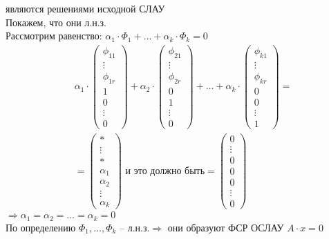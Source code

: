 \documentclass[a4paper,12pt]{article}
\begin{document}
являются решениями исходной СЛАУ\\
Покажем, что они л.н.з.\\
Рассмотрим равенство:
$\alpha_1\cdot \Phi_1+\ldots+\alpha_k\cdot \Phi_k=0$
\begin{align*}
&\alpha_1\cdot\begin{pmatrix}
\phi_{11}\\
\vdots\\
\phi_{1r}\\
1\\
0\\
\vdots\\
0
\end{pmatrix}+\alpha_2\cdot\begin{pmatrix}
\phi_{21}\\
\vdots\\
\phi_{2r}\\
0\\
1\\
\vdots\\
0
\end{pmatrix}+\ldots+\alpha_k\cdot\begin{pmatrix}
\phi_{k1}\\
\vdots\\
\phi_{kr}\\
0\\
0\\
\vdots\\
1
\end{pmatrix}=\\
&=\begin{pmatrix}
*\\
\vdots\\
*\\
\alpha_1\\
\alpha_2\\
\vdots\\
\alpha_k
\end{pmatrix}\text{ и это должно быть}=\begin{pmatrix}
0\\
\vdots\\
0\\
0\\
0\\
\vdots\\
0
\end{pmatrix}
\end{align*}
$\Rightarrow\alpha_1=\alpha_2=\ldots=\alpha_k=0$\\
По определению $\Phi_1, \ldots, \Phi_k$ -- л.н.з.$\Rightarrow$ они образуют ФСР ОСЛАУ $A\cdot x=0$
\end{document}
